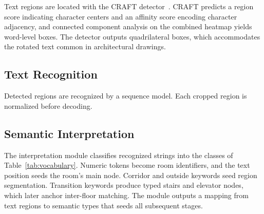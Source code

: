 \documentclass[manuscript,screen,review]{acmart}
\begin{document}
Text regions are located with the CRAFT detector~\cite{craft}. CRAFT predicts a region score indicating character centers and an affinity score encoding character adjacency, and connected component analysis on the combined heatmap yields word-level boxes. The detector outputs quadrilateral boxes, which accommodates the rotated text common in architectural drawings.

\subsection{Text Recognition}
\label{subsec:recognition}

Detected regions are recognized by a sequence model.  Each cropped region is normalized before decoding.


\subsection{Semantic Interpretation}
\label{sec:interpretation}

The interpretation module classifies recognized strings into the classes of Table~\ref{tab:vocabulary}. Numeric tokens become room identifiers, and the text position seeds the room's main node. Corridor and outside keywords seed region segmentation. Transition keywords produce typed stairs and elevator nodes, which later anchor inter-floor matching. The module outputs a mapping from text regions to semantic types that seeds all subsequent stages.

\end{document}
